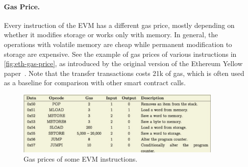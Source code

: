\paragraph{\textbf{Gas Price.}}
Every instruction of the EVM has a different gas price, mostly depending on whether it modifies storage or works only with memory. 
In general, the operations with volatile memory are cheap while permanent modification to storage are expensive.
See the example of gas prices of various instructions in \autoref{fig:eth-gas-price}, as introduced by the original version of the Ethereum Yellow paper~\cite{wood2014ethereum}. Note that the transfer transactions costs 21k of gas, which is often used as a baseline for comparison with other smart contract calls.


\begin{figure}[t]
	\begin{center}
		\includegraphics[width=0.9\textwidth]{./figs/gas-price.png}
		\caption{Gas prices of some EVM instructions.}		
		\label{fig:eth-gas-price}
	\end{center}	
\end{figure}


